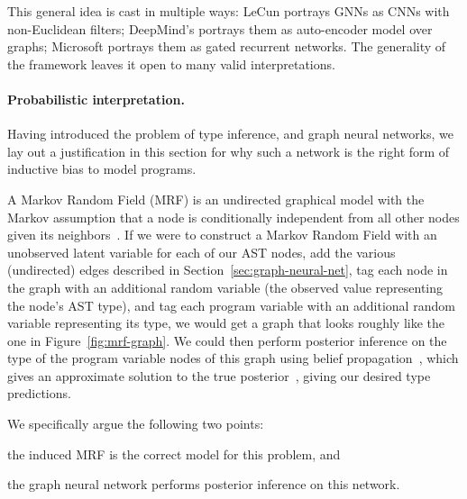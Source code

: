 This general idea is cast in multiple ways: LeCun portrays GNNs as CNNs with non-Euclidean filters; DeepMind's portrays them as auto-encoder model over graphs; Microsoft portrays them as gated recurrent networks.
The generality of the framework leaves it open to many valid interpretations.


\paragraph{Probabilistic interpretation.}
Having introduced the problem of type inference, and graph neural networks, we lay out a justification in this section for why such a network is the right form of inductive bias to model programs.

A Markov Random Field (MRF) is an undirected graphical model with the Markov assumption that a node is conditionally independent from all other nodes given its neighbors~\cite{kinderman80markov}.
If we were to construct a Markov Random Field with an unobserved latent variable for each of our AST nodes, add the various (undirected) edges described in Section~\ref{sec:graph-neural-net}, tag each node in the graph with an additional random variable (the observed value representing the node's AST type), and tag each program variable with an additional random variable representing its type, we would get a graph that looks roughly like the one in Figure~\ref{fig:mrf-graph}.
We could then perform posterior inference on the type of the program variable nodes of this graph using belief propagation~\cite{pearl2009causality}, which gives an approximate solution to the true posterior~\cite{weiss2000correctness}, giving our desired type predictions.

We specifically argue the following two points:
\begin{enumerate*}[label=(\roman*)]
	\item the induced MRF is the correct model for this problem, and
	\item the graph neural network performs posterior inference on this network.
\end{enumerate*}


